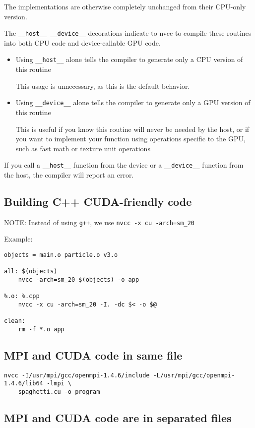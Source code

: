 The implementations are otherwise completely unchanged from their CPU-only version.


The \verb!__host__ __device__! decorations indicate to nvcc to compile these routines into both CPU code and device-callable GPU code. 
\begin{itemize}
  \item   Using \verb!__host__! alone tells the compiler to generate only a CPU version of this routine
  
  This usage is unnecessary, as this is the default behavior. 
  
  \item   Using \verb!__device__! alone tells the compiler to generate only a GPU version of this routine

This is useful if you know this routine will never be needed by the host, or if
you want to implement your function using operations specific to the GPU, such
as fast math or texture unit operations
\end{itemize}


If you call a \verb!__host__! function from the device or a \verb!__device__! function from the host, the compiler will report an error.


\subsection{Building C++ CUDA-friendly code}

NOTE: Instead of using \verb!g++!, we use 
\verb!nvcc -x cu -arch=sm_20! 

Example:
\begin{verbatim}
objects = main.o particle.o v3.o

all: $(objects)
    nvcc -arch=sm_20 $(objects) -o app

%.o: %.cpp
    nvcc -x cu -arch=sm_20 -I. -dc $< -o $@

clean:
    rm -f *.o app
\end{verbatim}


\subsection{MPI and CUDA code in same file}

\begin{verbatim}
nvcc -I/usr/mpi/gcc/openmpi-1.4.6/include -L/usr/mpi/gcc/openmpi-1.4.6/lib64 -lmpi \
    spaghetti.cu -o program
\end{verbatim}

\subsection{MPI and CUDA code are in separated files}

